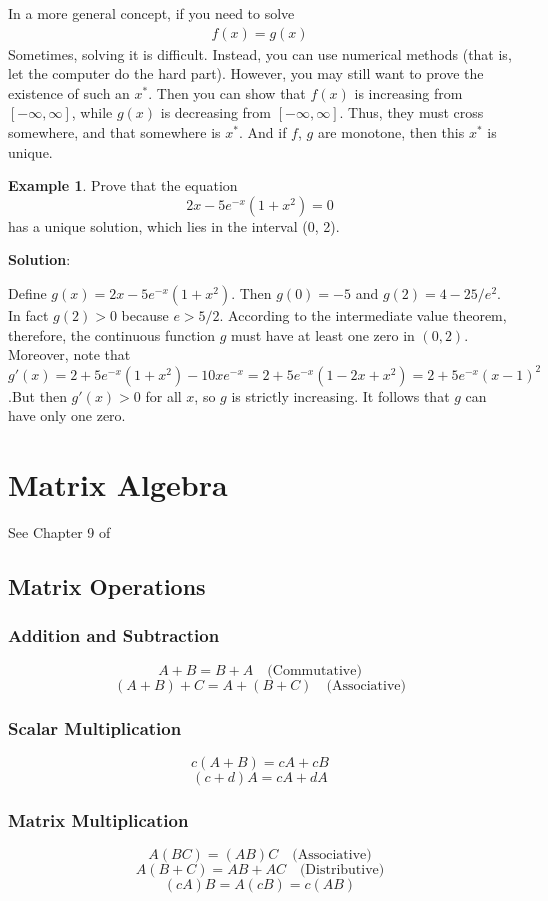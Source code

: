 \documentclass[11pt,a4paper]{book}
\theoremstyle{definition}\newtheorem{definition}{Definition}
\theoremstyle{definition}\newtheorem{fact}{Fact}
\theoremstyle{definition}\newtheorem{remark}{Remark}
\theoremstyle{definition}\newtheorem{ex}{Ex.}
\theoremstyle{definition}\newtheorem{project}{Project}
\theoremstyle{definition}\newtheorem{problem}{Problem}
\theoremstyle{definition}\newtheorem{example}{Example}
\numberwithin{theorem}{section}
\numberwithin{corollary}{chapter}
\numberwithin{assumption}{chapter}
\numberwithin{definition}{chapter}
\numberwithin{prop}{chapter}
\numberwithin{notation}{chapter}
\numberwithin{problem}{chapter}
\numberwithin{example}{chapter}
\numberwithin{fact}{chapter}
\numberwithin{ex}{chapter}
\begin{document}
\begin{appendices}
	In a more general concept, if you need to solve
	\begin{align*}
		f(x) = g(x)
	\end{align*}
	Sometimes, solving it is difficult. Instead, you can use numerical methods (that is, let the computer do the hard part). However, you may still want to prove the existence of such an $x^*$. Then you can show that $f(x)$ is increasing from $[-\infty,\infty]$, while $g(x)$ is decreasing from $[-\infty,\infty]$. Thus, they must cross somewhere, and that somewhere is $x^*$. And if $f$, $g$ are monotone, then this $x^*$ is unique.
	
	\begin{example}
		Prove that the equation
		$$2x - 5e^{-x}(1+x^2)=0$$
		has a unique solution, which lies in the interval (0, 2).
		
		\textbf{Solution}:
		
		Define $g(x) = 2x - 5e^{-x}(1 + x^2)$. Then $g(0) = -5$ and $g(2) = 4 - 25/e^2$. In fact $g(2) > 0$ because $e > 5/2$. According to the intermediate value theorem, therefore, the continuous function $g$ must have at least one zero in $(0, 2)$. Moreover, note that $g'(x) = 2 + 5e^{-x}(1+x^2)-10xe^{-x} =2+5e^{-x}(1-2x+x^2)=2+5e^{-x}(x-1)^2$.But then $g'(x)>0$ for all $x$, so $g$ is strictly increasing. It follows that $g$ can have only one zero.
	\end{example}
	
	\section{Matrix Algebra}
	See Chapter 9 of \citet{springcamp}
	\subsection{Matrix Operations}
	
	\subsubsection*{Addition and Subtraction}
	\[
	A + B = B + A \quad \text{(Commutative)}
	\]
	\[
	(A + B) + C = A + (B + C) \quad \text{(Associative)}
	\]
	
	\subsubsection*{Scalar Multiplication}
	\[
	c(A + B) = cA + cB
	\]
	\[
	(c + d)A = cA + dA
	\]
	
	\subsubsection*{Matrix Multiplication}
	\[
	A(BC) = (AB)C \quad \text{(Associative)}
	\]
	\[
	A(B + C) = AB + AC \quad \text{(Distributive)}
	\]
	\[
	(cA)B = A(cB) = c(AB)
	\]

\end{appendices}
\end{document}
